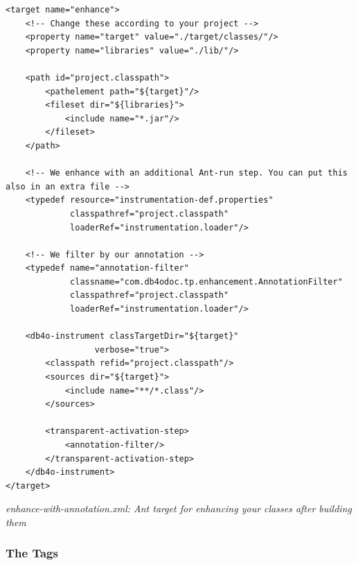 \begin{lstlisting}
<target name="enhance">
    <!-- Change these according to your project -->
    <property name="target" value="./target/classes/"/>
    <property name="libraries" value="./lib/"/>

    <path id="project.classpath">
        <pathelement path="${target}"/>
        <fileset dir="${libraries}">
            <include name="*.jar"/>
        </fileset>
    </path>

    <!-- We enhance with an additional Ant-run step. You can put this also in an extra file -->
    <typedef resource="instrumentation-def.properties"
             classpathref="project.classpath"
             loaderRef="instrumentation.loader"/>

    <!-- We filter by our annotation -->
    <typedef name="annotation-filter"
             classname="com.db4odoc.tp.enhancement.AnnotationFilter"
             classpathref="project.classpath"
             loaderRef="instrumentation.loader"/>

    <db4o-instrument classTargetDir="${target}"
                  verbose="true">
        <classpath refid="project.classpath"/>
        <sources dir="${target}">
            <include name="**/*.class"/>
        </sources>

        <transparent-activation-step>
            <annotation-filter/>
        </transparent-activation-step>
    </db4o-instrument>
</target>
\end{lstlisting}

{\small\itshape enhance-with-annotation.xml: Ant target for enhancing your classes after building them\par}
\medskip

\subsubsection*{The Tags}

